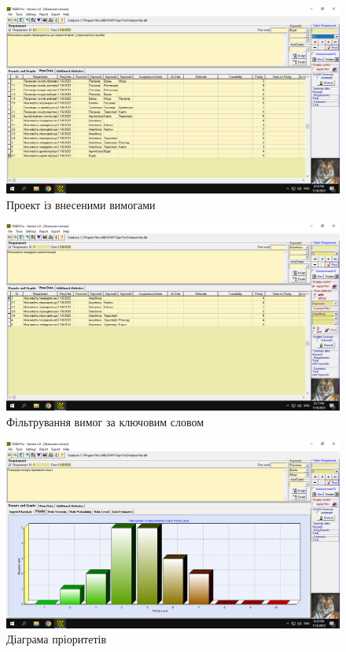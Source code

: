 \documentclass[14pt]{extreport}
\begin{document}
\begin{normalsize}
	\begin{figure}[H]
		\centering
		\includegraphics[scale=0.5]{3}
		\caption{Проект із внесеними вимогами}
	\end{figure}
	
	\begin{figure}[H]
		\centering
		\includegraphics[scale=0.5]{4}
		\caption{Фільтрування вимог за ключовим словом}
	\end{figure}
	
	\begin{figure}[H]
		\centering
		\includegraphics[scale=0.5]{5}
		\caption{Діаграма пріоритетів}
	\end{figure}
	

\end{normalsize}
\end{document}
